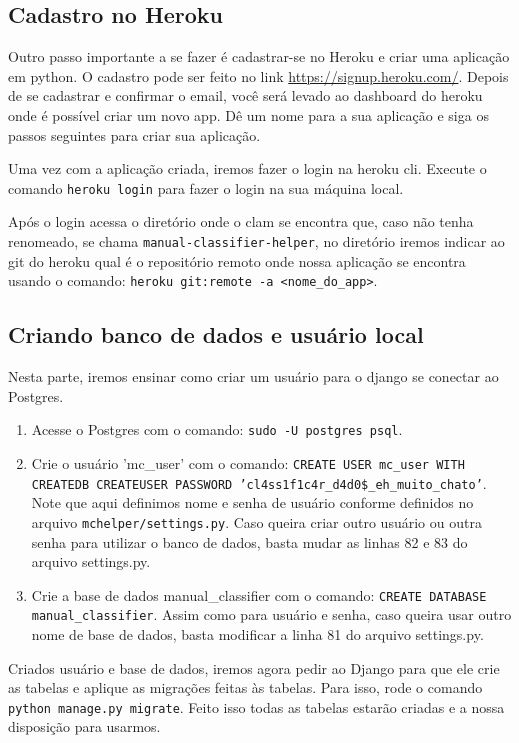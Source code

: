 \subsection{Cadastro no Heroku}

Outro passo importante a se fazer é cadastrar-se no Heroku e criar uma aplicação em python. O cadastro
pode ser feito no link \url{https://signup.heroku.com/}. Depois de se cadastrar e confirmar o email,
você será levado ao dashboard do heroku onde é possível criar um novo app. Dê um nome para a sua 
aplicação e siga os passos seguintes para criar sua aplicação.

Uma vez com a aplicação criada, iremos fazer o login na heroku cli. Execute o comando \texttt{heroku login} para fazer o login na sua máquina local.

Após o login acessa o diretório onde o clam se encontra que, caso não tenha renomeado, se chama
\texttt{manual-classifier-helper}, no diretório iremos indicar ao git do heroku qual é o repositório
remoto onde nossa aplicação se encontra usando o comando: \texttt{heroku git:remote -a <nome_do_app>}.

\subsection{Criando banco de dados e usuário local}
\label{subsec:database}

Nesta parte, iremos ensinar como criar um usuário para o django se conectar ao Postgres.

\begin{enumerate}
	\item Acesse o Postgres com o comando: \texttt{sudo -U postgres psql}.
	\item Crie o usuário 'mc_user' com o comando: \texttt{CREATE USER mc_user WITH CREATEDB CREATEUSER PASSWORD 'cl4ss1f1c4r_d4d0\$_eh_muito_chato'}. Note que aqui definimos nome e senha de usuário conforme
	definidos no arquivo \texttt{mchelper/settings.py}. Caso queira criar outro usuário ou outra senha
	para utilizar o banco de dados, basta mudar as linhas 82 e 83 do arquivo settings.py.
	\item Crie a base de dados manual_classifier com o comando: \texttt{CREATE DATABASE manual_classifier}.
	Assim como para usuário e senha, caso queira usar outro nome de base de dados, basta
	modificar a linha 81 do arquivo settings.py.
\end{enumerate}

Criados usuário e base de dados, iremos agora pedir ao Django para que ele crie as tabelas e
aplique as migrações feitas às tabelas. Para isso, rode o comando \texttt{python manage.py migrate}.
Feito isso todas as tabelas estarão criadas e a nossa disposição para usarmos.

